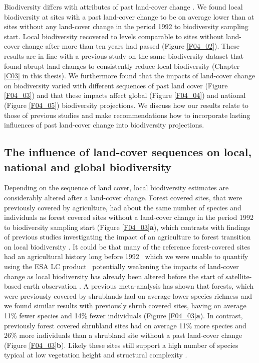 Biodiversity differs with attributes of past land-cover change \citep{Watson2014}. We found local biodiversity at sites with a past land-cover change to be on average lower than at sites without any land-cover change in the period 1992 to biodiversity sampling start. Local biodiversity recovered to levels comparable to sites without land-cover change after more than ten years had passed (Figure \ref{F04_02}). These results are in line with a previous study on the same biodiversity dataset that found abrupt land changes to consistently reduce local biodiversity (Chapter \ref{C03} in this thesis). We furthermore found that the impacts of land-cover change on biodiversity varied with different sequences of past land cover (Figure \ref{F04_03}) and that these impacts affect global (Figure \ref{F04_04}) and national (Figure \ref{F04_05}) biodiversity projections. We discuss how our results relate to those of previous studies and make recommendations how to incorporate lasting influences of past land-cover change into biodiversity projections.

\subsection{The influence of land-cover sequences on local, national and global biodiversity}
\label{C04_0401}

Depending on the sequence of land cover, local biodiversity estimates are considerably altered after a land-cover change. Forest covered sites, that were previously covered by agriculture, had about the same number of species and individuals as forest covered sites without a land-cover change in the period 1992 to biodiversity sampling start (Figure \ref{F04_03}\textbf{a}), which contrasts with findings of previous studies investigating the impact of an agriculture to forest transition on local biodiversity \citep{Bellemare2002,Hermy2007,Dyer2010}. It could be that many of the reference forest-covered sites had an agricultural history long before 1992 \textendash\ which we were unable to quantify using the ESA LC product \textendash\ potentially weakening the impacts of land-cover change as local biodiversity has already been altered before the start of satellite-based earth observation \citep{Ellis2010,McMichael2017}. A previous meta-analysis has shown that forests, which were previously covered by shrublands had on average lower species richness \citep{Bremer2010} and we found similar results with previously shrub covered sites, having on average 11\% fewer species and 14\% fewer individuals (Figure \ref{F04_03}\textbf{a}). In contrast, previously forest covered shrubland sites had on average 11\% more species and 26\% more individuals than a shrubland site without a past land-cover change (Figure \ref{F04_03}\textbf{b}). Likely these sites still support a high number of species typical at low vegetation height and structural complexity \citep{Chazdon2016}. 

